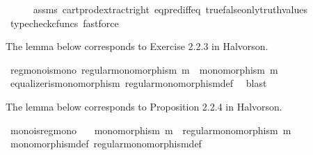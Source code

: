 \begin{isabellebody}
%
\isadelimproof
\ \ \ \ %
\endisadelimproof
%
\isatagproof
{}\isamarkupfalse%
\ assms\ cart{\isacharunderscore}{\kern0pt}prod{\isacharunderscore}{\kern0pt}extract{\isacharunderscore}{\kern0pt}right\ eq{\isacharunderscore}{\kern0pt}pred{\isacharunderscore}{\kern0pt}iff{\isacharunderscore}{\kern0pt}eq\ true{\isacharunderscore}{\kern0pt}false{\isacharunderscore}{\kern0pt}only{\isacharunderscore}{\kern0pt}truth{\isacharunderscore}{\kern0pt}values\ \ \isamarkupfalse%
\ {\isacharparenleft}{\kern0pt}typecheck{\isacharunderscore}{\kern0pt}cfuncs{\isacharcomma}{\kern0pt}\ fastforce{\isacharparenright}{\kern0pt}%
\endisatagproof
{\isafoldproof}%
%
\isadelimproof
%
\endisadelimproof
%
\isadelimdocument
%
\endisadelimdocument
%
\isatagdocument
%
\isamarkuptrue%
%
\endisatagdocument
{\isafolddocument}%
%
\isadelimdocument
%
\endisadelimdocument
%
\begin{isamarkuptext}%
The lemma below corresponds to Exercise 2.2.3 in Halvorson.%
\end{isamarkuptext}\isamarkuptrue%
\isamarkupfalse%
\ regmono{\isacharunderscore}{\kern0pt}is{\isacharunderscore}{\kern0pt}mono{\isacharcolon}{\kern0pt}\ {\isachardoublequoteopen}regular{\isacharunderscore}{\kern0pt}monomorphism\ m\ {\isasymLongrightarrow}\ monomorphism\ m{\isachardoublequoteclose}\isanewline
%
\isadelimproof
\ \ %
\endisadelimproof
%
\isatagproof
{}\isamarkupfalse%
\ equalizer{\isacharunderscore}{\kern0pt}is{\isacharunderscore}{\kern0pt}monomorphism\ regular{\isacharunderscore}{\kern0pt}monomorphism{\isacharunderscore}{\kern0pt}def\ \isamarkupfalse%
\ blast%
\endisatagproof
{\isafoldproof}%
%
\isadelimproof
%
\endisadelimproof
%
\begin{isamarkuptext}%
The lemma below corresponds to Proposition 2.2.4 in Halvorson.%
\end{isamarkuptext}\isamarkuptrue%
\isamarkupfalse%
\ mono{\isacharunderscore}{\kern0pt}is{\isacharunderscore}{\kern0pt}regmono{\isacharcolon}{\kern0pt}\isanewline
\ \ \ {\isachardoublequoteopen}monomorphism\ m\ {\isasymLongrightarrow}\ regular{\isacharunderscore}{\kern0pt}monomorphism\ m{\isachardoublequoteclose}\isanewline
%
\isadelimproof
\ \ %
\endisadelimproof
%
\isatagproof
{}\isamarkupfalse%
\ monomorphism{\isacharunderscore}{\kern0pt}def\ regular{\isacharunderscore}{\kern0pt}monomorphism{\isacharunderscore}{\kern0pt}def\isanewline
\ \ \isamarkupfalse%

\end{isabellebody}
